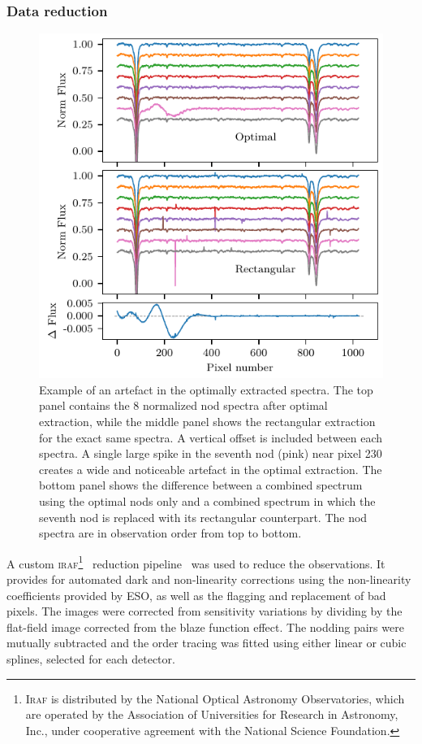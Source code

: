 \documentclass[fleqn,usenatbib]{mnras}
\begin{document}
\subsubsection{Data reduction}
\label{subsubsec:reduction}
\begin{figure}
    \includegraphics[width=\hsize]{images/fig1.pdf}
    \caption{Example of an artefact in the optimally extracted spectra. The top panel contains the 8 normalized nod spectra after optimal extraction, while the middle panel shows the rectangular extraction for the exact same spectra. A vertical offset is included between each spectra. A single large spike in the seventh nod (pink) near pixel 230 creates a wide and noticeable artefact in the optimal extraction. The bottom panel shows the difference between a combined spectrum using the optimal nods only and a combined spectrum in which the seventh nod is replaced with its rectangular counterpart. The nod spectra are in observation order from top to bottom.}
    \label{fig:nod_artefacts}
\end{figure}

A custom \textsc{iraf}\footnote{\textsc{Iraf} is distributed by the National Optical Astronomy Observatories, which are operated by the Association of Universities for Research in Astronomy, {Inc.}, under cooperative agreement with the National Science Foundation.}~\citep{tody_iraf_1993} reduction pipeline~\citep{figueira_radial_2010} was used to reduce the observations. It provides for automated dark and non-linearity corrections using the non-linearity coefficients provided by ESO, as well as the flagging and replacement of bad pixels. The images were corrected from sensitivity variations by dividing by the flat-field image corrected from the blaze function effect. The nodding pairs were mutually subtracted and the order tracing was fitted using either linear or cubic splines, selected for each detector.
\end{document}
